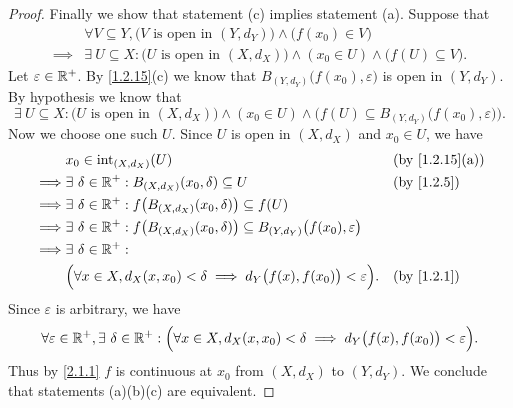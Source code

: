 \begin{proof}
  Finally we show that statement (c) implies statement (a).
  Suppose that
  \begin{align*}
             & \forall V \subseteq Y, \big(V \text{ is open in } (Y, d_Y)\big) \land \big(f(x_0) \in V\big)                          \\
    \implies & \exists\ U \subseteq X : \big(U \text{ is open in } (X, d_X)\big) \land (x_0 \in U) \land \big(f(U) \subseteq V\big).
  \end{align*}
  Let \(\varepsilon \in \mathbb{R}^+\).
  By \cref{1.2.15}(c) we know that \(B_{(Y, d_Y)}\big(f(x_0), \varepsilon\big)\) is open in \((Y, d_Y)\).
  By hypothesis we know that
  \[
    \exists\ U \subseteq X : \big(U \text{ is open in } (X, d_X)\big) \land (x_0 \in U) \land \Big(f(U) \subseteq B_{(Y, d_Y)}\big(f(x_0), \varepsilon\big)\Big).
  \]
  Now we choose one such \(U\).
  Since \(U\) is open in \((X, d_X)\) and \(x_0 \in U\), we have
  \begin{align*}
             & x_0 \in \text{int}_{(X, d_X)}(U)                                                                                    &  & \text{(by \cref{1.2.15}(a))} \\
    \implies & \exists\ \delta \in \R^+ : B_{(X, d_X)}(x_0, \delta) \subseteq U                                                    &  & \text{(by \cref{1.2.5})}     \\
    \implies & \exists\ \delta \in \R^+ : f\big(B_{(X, d_X)}(x_0, \delta)\big) \subseteq f(U)                                                                        \\
    \implies & \exists\ \delta \in \R^+ : f\big(B_{(X, d_X)}(x_0, \delta)\big) \subseteq B_{(Y, d_Y)}\big(f(x_0), \varepsilon\big)                                   \\
    \implies & \exists\ \delta \in \R^+ :                                                                                                                            \\
             & \Big(\forall x \in X, d_X(x, x_0) < \delta \implies d_Y\big(f(x), f(x_0)\big) < \varepsilon\Big).                   &  & \text{(by \cref{1.2.1})}
  \end{align*}
  Since \(\varepsilon\) is arbitrary, we have
  \[
    \forall \varepsilon \in \mathbb{R}^+, \exists\ \delta \in \mathbb{R}^+ : \Big(\forall x \in X, d_X(x, x_0) < \delta \implies d_Y\big(f(x), f(x_0)\big) < \varepsilon\Big).
  \]
  Thus by \cref{2.1.1} \(f\) is continuous at \(x_0\) from \((X, d_X)\) to \((Y, d_Y)\).
  We conclude that statements (a)(b)(c) are equivalent.
\end{proof}

